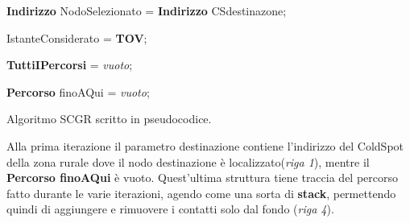 \documentclass[12pt,a4paper,oneside]{book}
\begin{document}
		
		\begin{algorithm}
			\SetStartEndCondition{ (}{)}{)}\SetAlgoBlockMarkers{}{\}}
			\AlgoDisplayBlockMarkers\SetAlgoNoLine
			\newcommand{\forcond}{$i=0$ \KwTo $n$}
			
			\textbf{Indirizzo} NodoSelezionato = \textbf{Indirizzo} CSdestinazone;

			IstanteConsiderato = \textbf{TOV};

			\textbf{TuttiIPercorsi} = \textit{vuoto};

			\textbf{Percorso} finoAQui  = \textit{vuoto};			
			
		
		\caption{Algoritmo SCGR scritto in pseudocodice.}
		\label{scgr}		
		\end{algorithm}
		
		
		Alla prima iterazione il parametro destinazione contiene l'indirizzo del ColdSpot della zona rurale dove il nodo destinazione è localizzato({\it riga 1}), mentre il {\bf Percorso finoAQui} è vuoto. Quest'ultima struttura tiene traccia del percorso fatto durante le varie iterazioni, agendo come una sorta di {\bf stack}, permettendo quindi di aggiungere e rimuovere i contatti solo dal fondo ({\it riga 4}). 
		
\end{document}
